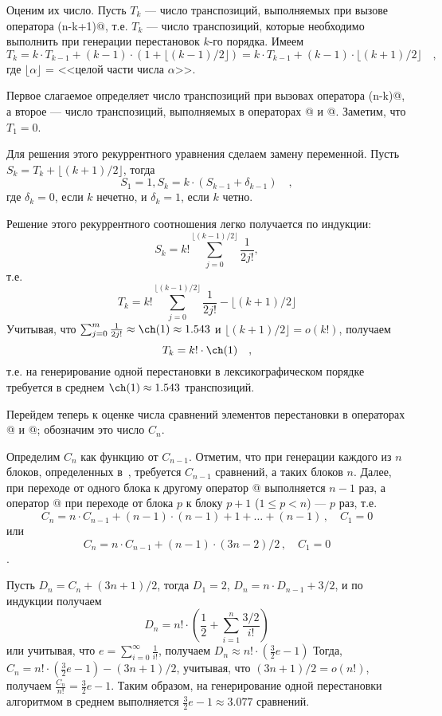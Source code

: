 \documentclass[12pt,a4paper]{article}
\theoremstyle{plain}
\theoremstyle{definition}
\theoremstyle{remark}
\begin{document}
Оценим их число. Пусть $T_k$ --- число транспозиций, выполняемых при вызове оператора \verb@LEC(n-k+1)@, т.е. $T_k$ --- число транспозиций, которые необходимо выполнить при генерации перестановок $k$-го порядка. Имеем \[ T_k =k\cdot T_{k-1}+(k-1)\cdot(1+\lfloor(k-1)/2\rfloor)= k\cdot T_{k-1}+(k-1)\cdot\lfloor(k+1)/2\rfloor \quad,\] где $\lfloor\alpha\rfloor$ = <<целой части числа $\alpha$>>.

Первое слагаемое определяет число транспозиций при вызовах оператора \verb@LEC(n-k)@, а второе --- число транспозиций, выполняемых в операторах @ и @. Заметим, что $T_1=0$.

Для решения этого рекуррентного уравнения сделаем замену переменной. Пусть $S_k=T_k+\lfloor(k+1)/2\rfloor$, тогда \[ S_1=1, S_k=k\cdot(S_{k-1}+\delta_{k-1})\quad, \] где $\delta_k=0$, если $k$ нечетно, и $\delta_k=1$, если $k$ четно.

Решение этого рекуррентного соотношения легко получается по индукции: 
\[S_k = k! \sum_{j=0}^{\lfloor (k-1)/2 \rfloor} \frac{1}{2j!}, \] т.е. 
\[T_k = k! \sum_{j=0}^{\lfloor (k-1)/2 \rfloor} \frac{1}{2j!} - \lfloor (k+1)/2 \rfloor \] Учитывая, что $\sum_{j=0}^{m} \frac{1}{2j!} \approx \ch(1) \approx 1.543$ и $\lfloor (k+1)/2 \rfloor = o(k!)$, получаем \[ T_k = k! \cdot \ch(1)\quad, \] т.е. на генерирование одной перестановки в лексикографическом порядке требуется в среднем $\ch(1)\approx 1.543$ транспозиций.

Перейдем теперь к оценке числа сравнений элементов перестановки в операторах @ и @; обозначим это число $C_n$.

Определим $C_n$ как функцию от $C_{n-1}$. Отметим, что при генерации каждого из $n$ блоков, определенных в~, требуется $C_{n-1}$ сравнений, а таких блоков $n$. Далее, при переходе от одного блока к другому оператор @ выполняется $n-1$ раз, а оператор @ при переходе от блока $p$ к блоку $p+1$ ($1\le p<n$) --- $p$ раз, т.е.
\[ C_n = n\cdot C_{n-1} + (n-1)\cdot(n-1)+1+\ldots+(n-1) \,,\quad C_1=0 \]
или 
\[ C_n = n\cdot C_{n-1}+(n-1)\cdot(3n-2)/2 \,,\quad C_1=0 \].

Пусть $D_n=C_n+(3n+1)/2$, тогда $D_1=2$, $D_n=n\cdot D_{n-1}+3/2$, и по индукции получаем 
\[ D_n = n! \cdot (\frac{1}{2} + \sum_{i=1}^{n} \frac{3/2}{i!}) \]
или учитывая, что $e = \sum_{i=0}^{\infty} \frac{1}{i!} $, получаем $D_n \approx n!\cdot(\frac{3}{2}e - 1)$
Тогда, $C_n = n!\cdot (\frac{3}{2}e - 1) - (3n+1)/2$, учитывая, что $(3n+1)/2 = o(n!)$, получаем $\frac{C_n}{n!} = \frac{3}{2}e - 1$. Таким образом, на генерирование одной перестановки алгоритмом \verb@LEX@ в среднем выполняется $\frac{3}{2}e-1 \approx 3.077$ сравнений.
\end{document}
